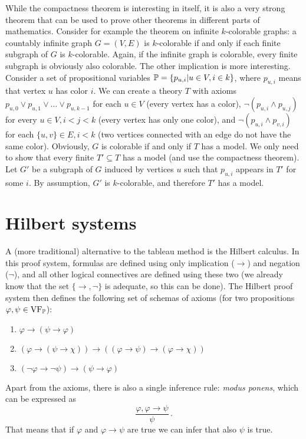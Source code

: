 While the compactness theorem is interesting in itself, it is also a very strong theorem that can be used to prove other theorems in different parts of mathematics. Consider for example the theorem on infinite $k$-colorable graphs: a countably infinite graph $G = (V, E)$ is $k$-colorable if and only if each finite subgraph of $G$ is $k$-colorable. Again, if the infinite graph is colorable, every finite subgraph is obviously also colorable. The other implication is more interesting. Consider a set of propositional variables $\mathbb{P} = \{p_{u,i} | u \in V, i \in k\}$, where $p_{u,i}$ means that vertex $u$ has color $i$. We can create a theory $T$ with axioms $p_{u,0} \lor p_{u,1} \lor \dots \lor p_{u,k-1}$ for each $u \in V$ (every vertex has a color), $\neg(p_{u,i} \land p_{u,j})$ for every $u \in V, i < j < k$ (every vertex has only one color), and $\neg(p_{u,i} \land p_{v,i})$ for each $\{u,v\}\in E, i < k$ (two vertices connected with an edge do not have the same color). Obviously, $G$ is colorable if and only if $T$ has a model. We only need to show that every finite $T' \subseteq T$ has a model (and use the compactness theorem). Let $G'$ be a subgraph of $G$ induced by  vertices $u$ such that $p_{u,i}$ appears in $T'$ for some $i$. By assumption, $G'$ is $k$-colorable, and therefore $T'$ has a model.

\section{Hilbert systems}

A (more traditional) alternative to the tableau method is the Hilbert calculus. In this proof system, formulas are defined using only implication ($\to$) and negation ($\neg$), and all other logical connectives are defined using these two (we already know that the set $\{\to, \neg\}$ is adequate, so this can be done). The Hilbert proof system then defines the following set of schemas of axioms (for two propositions $\varphi, \psi \in \operatorname{VF}_\mathbb{P}$):
\begin{enumerate}
\item $\varphi \to (\psi \to \varphi)$
\item $(\varphi \to (\psi \to \chi)) \to ((\varphi \to \psi) \to (\varphi \to \chi))$
\item $(\neg \varphi \to \neg \psi) \to (\psi \to \varphi)$
\end{enumerate}
Apart from the axioms, there is also a single inference rule: \emph{modus ponens}, which can be expressed as $$\frac{\varphi, \varphi \to \psi}{\psi}\,.$$That means that if $\varphi$ and $\varphi \to \psi$ are true we can infer that also $\psi$ is true.

